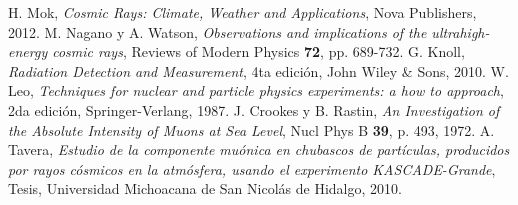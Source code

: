 \documentclass[a4paper,10pt]{article}
\numberwithin{equation}{section}
\begin{document}
\begin{thebibliography}{10}
H. Mok, \emph{Cosmic Rays: Climate, Weather and Applications}, Nova Publishers, 
2012.
M. Nagano y A. Watson, \emph{Observations and implications of the ultrahigh-energy 
cosmic rays}, Reviews of Modern Physics \textbf{72}, pp. 689-732.
G. Knoll, \emph{Radiation Detection and Measurement}, 4ta edición, John Wiley \& Sons,
2010.
W. Leo, \emph{Techniques for nuclear and particle physics experiments: a how to 
approach}, 2da edición, Springer-Verlang, 1987.
J. Crookes y B. Rastin, \emph{An Investigation of the Absolute Intensity of Muons at Sea Level}, 
Nucl Phys B \textbf{39}, p. 493, 1972.
A. Tavera, \emph{Estudio de la componente muónica en chubascos de partículas, 
producidos por rayos cósmicos en la atmósfera, usando el experimento
KASCADE-Grande}, Tesis, Universidad Michoacana de San Nicolás de Hidalgo, 2010.
\end{thebibliography}
\end{document}
